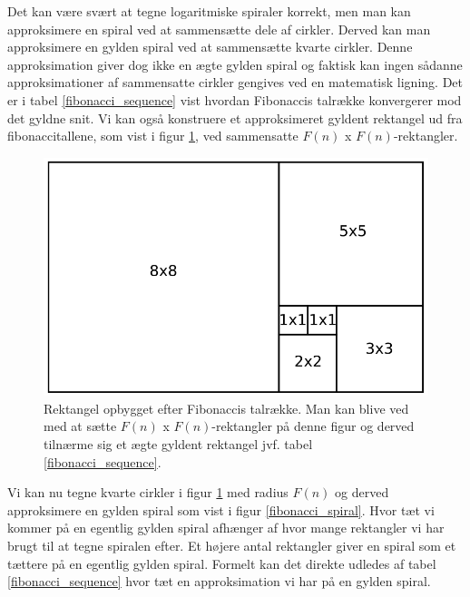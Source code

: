 {Det kan være svært at tegne logaritmiske spiraler korrekt, men man kan
approksimere en spiral ved at sammensætte dele af cirkler. Derved kan
man approksimere en gylden spiral ved at sammensætte kvarte cirkler.
Denne approksimation giver dog ikke en ægte gylden spiral og faktisk kan
ingen sådanne approksimationer af sammensatte cirkler gengives ved en
matematisk ligning\cite{Sharp2002}. Det er i tabel
\ref{fibonacci_sequence} vist hvordan Fibonaccis talrække konvergerer
mod det gyldne snit. Vi kan også konstruere et approksimeret gyldent
rektangel ud fra fibonaccitallene, som vist i figur
\ref{fibonacci_rektangel}, ved sammensatte $F(n)$ x $F(n)$-rektangler.
\begin{figure}[h!]
	\begin{center}
		\includegraphics[scale=0.35,angle=0]{afsnit/baggrund/billeder/fib_rect}
	\end{center}
    \caption[Rektangel opbygget efter Fibonaccis talrække]{Rektangel
    opbygget efter Fibonaccis talrække. Man kan blive ved med at sætte
    $F(n)$ x $F(n)$-rektangler på denne figur og derved tilnærme sig et
    ægte gyldent rektangel jvf. tabel \ref{fibonacci_sequence}.}
	\label{fibonacci_rektangel}
\end{figure}
Vi kan nu tegne kvarte cirkler i figur \ref{fibonacci_rektangel} med
radius $F(n)$ og derved approksimere en gylden spiral som vist i figur
\ref{fibonacci_spiral}. Hvor tæt vi kommer på en egentlig gylden spiral
afhænger af hvor mange rektangler vi har brugt til at tegne spiralen
efter. Et højere antal rektangler giver en spiral som et tættere på en
egentlig gylden spiral. Formelt kan det direkte udledes af tabel
\ref{fibonacci_sequence} hvor tæt en approksimation vi har på en gylden
spiral.
\begin{figure}[h!]

\end{figure}}
